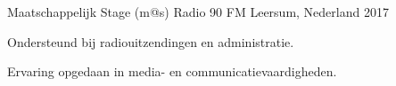 \begin{cventries}
  \cventry
    {Maatschappelijk Stage (m@s)} %
    {Radio 90 FM} %
    {Leersum, Nederland} %
    {2017} %
    {
      \begin{cvitems}
        \item {Ondersteund bij radiouitzendingen en administratie.}
        \item {Ervaring opgedaan in media- en communicatievaardigheden.}
      \end{cvitems}
    }

\end{cventries}